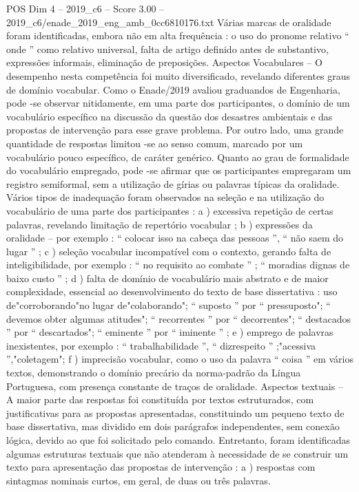 \begin{textsample}{POS Dim 4 – 2019\_c6 – Score 3.00 – 2019\_c6/enade\_2019\_eng\_amb\_0cc6810176.txt}
Várias marcas de oralidade foram identificadas, embora não em alta frequência : o uso do pronome relativo “ onde ” como relativo universal, falta de artigo definido antes de substantivo, expressões informais, eliminação de preposições.
Aspectos Vocabulares – O desempenho nesta competência foi muito diversificado, revelando diferentes graus de domínio vocabular.
Como o Enade/2019 avaliou graduandos de Engenharia, pode -se observar nitidamente, em uma parte dos participantes, o domínio de um vocabulário específico na discussão da questão dos desastres ambientais e das propostas de intervenção para esse grave problema.
Por outro lado, uma grande quantidade de respostas limitou -se ao senso comum, marcado por um vocabulário pouco específico, de caráter genérico.
Quanto ao grau de formalidade do vocabulário empregado, pode -se afirmar que os participantes empregaram um registro semiformal, sem a utilização de gírias ou palavras típicas da oralidade.
Vários tipos de inadequação foram observados na seleção e na utilização do vocabulário de uma parte dos participantes : a ) excessiva repetição de certas palavras, revelando limitação de repertório vocabular ; b ) expressões da oralidade – por exemplo : “ colocar isso na cabeça das pessoas ”, “ não saem do lugar ” ; c ) seleção vocabular incompatível com o contexto, gerando falta de inteligibilidade, por exemplo : “ no requisito ao combate ” ; “ moradias dignas de baixo custo ” ; d ) falta de domínio de vocabulário mais abstrato e de maior complexidade, essencial ao desenvolvimento do texto de base dissertativa : uso de"corroborando"no lugar de"colaborando"; “ suposto ” por “ pressuposto"; “ devemos obter algumas atitudes"; “ recorrentes ” por “ decorrentes"; “ destacados ” por “ descartados"; “ eminente ” por “ iminente ” ; e ) emprego de palavras inexistentes, por exemplo : “ trabalhabilidade ”, “ dizrespeito ” ;"acessiva ”,"coletagem"; f ) imprecisão vocabular, como o uso da palavra “ coisa ” em vários textos, demonstrando o domínio precário da norma-padrão da Língua Portuguesa, com presença constante de traços de oralidade.
Aspectos textuais – A maior parte das respostas foi constituída por textos estruturados, com justificativas para as propostas apresentadas, constituindo um pequeno texto de base dissertativa, mas dividido em dois parágrafos independentes, sem conexão lógica, devido ao que foi solicitado pelo comando.
Entretanto, foram identificadas algumas estruturas textuais que não atenderam à necessidade de se construir um texto para apresentação das propostas de intervenção : a ) respostas com sintagmas nominais curtos, em geral, de duas ou três palavras.

\end{textsample}
